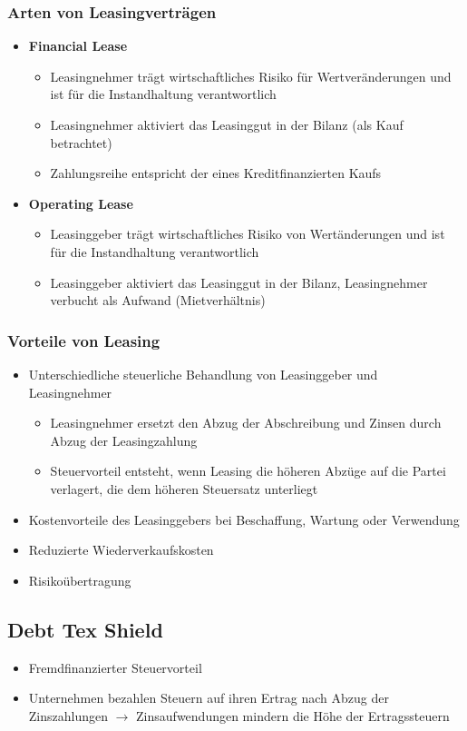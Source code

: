 \subsubsection{Arten von Leasingverträgen}
\begin{itemize}
	\item \textbf{Financial Lease}
	\begin{itemize}
		\item Leasingnehmer trägt wirtschaftliches Risiko für Wertveränderungen und ist für die Instandhaltung verantwortlich
		\item Leasingnehmer aktiviert das Leasinggut in der Bilanz (als Kauf betrachtet)
		\item Zahlungsreihe entspricht der eines Kreditfinanzierten Kaufs
	\end{itemize}
	\item \textbf{Operating Lease}
	\begin{itemize}
		\item Leasinggeber trägt wirtschaftliches Risiko von Wertänderungen und ist für die Instandhaltung verantwortlich
		\item Leasinggeber aktiviert das Leasinggut in der Bilanz, Leasingnehmer verbucht als Aufwand (Mietverhältnis)
	\end{itemize}
\end{itemize}

\subsubsection{Vorteile von Leasing}
\begin{itemize}
	\item Unterschiedliche steuerliche Behandlung von Leasinggeber und Leasingnehmer
	\begin{itemize}
		\item Leasingnehmer ersetzt den Abzug der Abschreibung und Zinsen durch Abzug der Leasingzahlung
		\item Steuervorteil entsteht, wenn Leasing die höheren Abzüge auf die Partei verlagert, die dem höheren Steuersatz unterliegt
	\end{itemize}
	\item Kostenvorteile des Leasinggebers bei Beschaffung, Wartung oder Verwendung
	\item Reduzierte Wiederverkaufskosten
	\item Risikoübertragung
\end{itemize}


\subsection{Debt Tex Shield}
\begin{itemize}
	\item Fremdfinanzierter Steuervorteil
	\item Unternehmen bezahlen Steuern auf ihren Ertrag nach Abzug der Zinszahlungen $\rightarrow$ Zinsaufwendungen mindern die Höhe der Ertragssteuern
\end{itemize}




